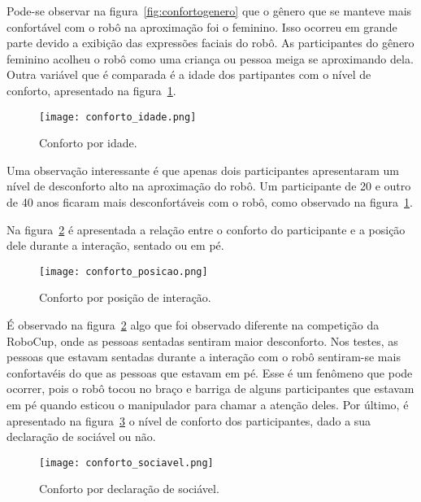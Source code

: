 Pode-se observar na figura~\ref{fig:confortogenero} que o gênero que se manteve mais confortável com o robô na aproximação foi o feminino. Isso ocorreu em grande parte devido a exibição das expressões faciais do robô. As participantes do gênero feminino acolheu o robô como uma criança ou pessoa meiga se aproximando dela. Outra variável que é comparada é a idade dos partipantes com o nível de conforto, apresentado na figura~\ref{fig:confortoidade}.

\begin{figure}[ht!]
	\centering
	\begin{minipage}{0.65\textwidth}
		\caption{Conforto por idade.}
		\texttt{[image: conforto\_idade.png]}
		\label{fig:confortoidade}
	\end{minipage}
\end{figure}

Uma observação interessante é que apenas dois participantes apresentaram um nível de desconforto alto na aproximação do robô. Um participante de 20 e outro de 40 anos ficaram mais desconfortáveis com o robô, como observado na figura~\ref{fig:confortoidade}.

Na figura~\ref{fig:confortoposicao} é apresentada a relação entre o conforto do participante e a posição dele durante a interação, sentado ou em pé.

\begin{figure}[ht!]
	\centering
	\begin{minipage}{0.65\textwidth}
		\caption{Conforto por posição de interação.}
		\texttt{[image: conforto\_posicao.png]}
		\label{fig:confortoposicao}
	\end{minipage}
\end{figure}

É observado na figura~\ref{fig:confortoposicao} algo que foi observado diferente na competição da RoboCup, onde as pessoas sentadas sentiram maior desconforto. Nos testes, as pessoas que estavam sentadas durante a interação com o robô sentiram-se mais confortavéis do que as pessoas que estavam em pé. Esse é um fenômeno que pode ocorrer, pois o robô tocou no braço e barriga de alguns participantes que estavam em pé quando esticou o manipulador para chamar a atenção deles. Por último, é apresentado na figura~\ref{fig:confortosociavel} o nível de conforto dos participantes, dado a sua declaração de sociável ou não.

\begin{figure}[ht!]
	\centering
	\begin{minipage}{0.65\textwidth}
		\caption{Conforto por declaração de sociável.}
		\texttt{[image: conforto\_sociavel.png]}
		\label{fig:confortosociavel}
	\end{minipage}
\end{figure}

